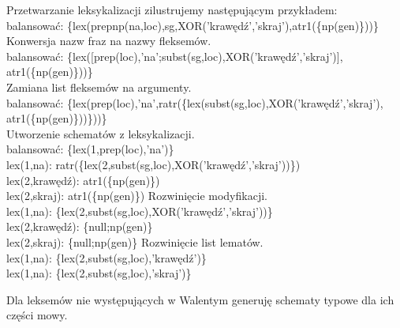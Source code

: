 \documentclass[oneside,pwrcover,withmarginpar,hidelinks,11pt]{article}
\begin{document}
Przetwarzanie leksykalizacji zilustrujemy następującym przykładem:\\
balansować: \{lex(prepnp(na,loc),sg,XOR('krawędź','skraj'),atr1(\{np(gen)\}))\}
Konwersja nazw fraz na nazwy fleksemów.\\
balansować: \{lex([prep(loc),'na';subst(sg,loc),XOR('krawędź','skraj')], atr1(\{np(gen)\}))\}\\
Zamiana list fleksemów na argumenty.\\
balansować: \{lex(prep(loc),'na',ratr(\{lex(subst(sg,loc),XOR('krawędź','skraj'), atr1(\{np(gen)\}))\}))\}\\
Utworzenie schematów z leksykalizacji.\\
balansować: \{lex(1,prep(loc),'na')\}\\
lex(1,na): ratr(\{lex(2,subst(sg,loc),XOR('krawędź','skraj'))\})\\
lex(2,krawędź): atr1(\{np(gen)\})\\
lex(2,skraj): atr1(\{np(gen)\})
Rozwinięcie modyfikacji.\\
lex(1,na): \{lex(2,subst(sg,loc),XOR('krawędź','skraj'))\}\\
lex(2,krawędź): \{null;np(gen)\}\\
lex(2,skraj): \{null;np(gen)\}
Rozwinięcie list lematów.\\
lex(1,na): \{lex(2,subst(sg,loc),'krawędź')\}\\
lex(1,na): \{lex(2,subst(sg,loc),'skraj')\}

Dla leksemów nie występujących w Walentym generuję schematy typowe dla ich części mowy.
\end{document}
